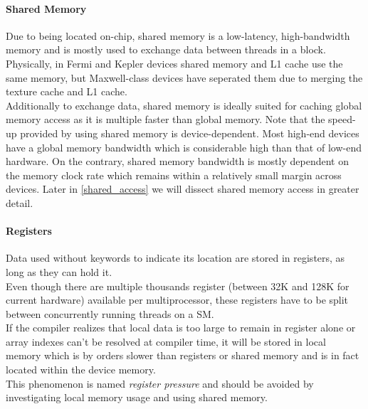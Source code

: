 \paragraph{Shared Memory}
Due to being located on-chip, shared memory is a low-latency, high-bandwidth memory and is mostly used to exchange data between threads in a block.\\
Physically, in Fermi and Kepler devices shared memory and L1 cache use the same memory,
but Maxwell-class devices have seperated them due to merging the texture cache and L1 cache.\\
Additionally to exchange data, shared memory is ideally suited for caching global memory access as it is multiple faster than global memory.
Note that the speed-up provided by using shared memory is device-dependent.
Most high-end devices have a global memory bandwidth which is considerable high than that of low-end hardware.
On the contrary, shared memory bandwidth is mostly dependent on the memory clock rate which remains within a relatively small margin across devices\cite{shane_shared_memory}.
Later in \ref{shared_access} we will dissect shared memory access in greater detail.\\
\paragraph{Registers}
Data used without keywords to indicate its location are stored in registers, as long as they can hold it.\\
Even though there are multiple thousands register (between 32K and 128K for current hardware) available per multiprocessor,
these registers have to be split between concurrently running threads on a SM.\\
If the compiler realizes that local data is too large to remain in register alone or array indexes can't be resolved at compiler time,
it will be stored in local memory which is by orders slower than registers or shared memory and is in fact located within the device memory.\\
This phenomenon is named \emph{register pressure} and should be avoided by investigating local memory usage
and using shared memory.\\
